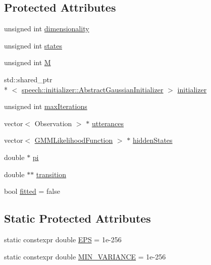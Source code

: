 \subsection*{Protected Attributes}
\begin{DoxyCompactItemize}
\item 
unsigned int \hyperlink{classspeech_1_1HMMLexicon_1_1MultivariateGaussianHMM_aa88d45cf1e299711ed0764166bb70bf1}{dimensionality}
\item 
unsigned int \hyperlink{classspeech_1_1HMMLexicon_1_1MultivariateGaussianHMM_a229cdec64f3eb25b3dc21aa32995ecd8}{states}
\item 
unsigned int \hyperlink{classspeech_1_1HMMLexicon_1_1MultivariateGaussianHMM_a6895e59700c70169286b362532cf3a37}{M}
\item 
std\+::shared\+\_\+ptr\\*
$<$ \hyperlink{classspeech_1_1initializer_1_1AbstractGaussianInitializer}{speech\+::initializer\+::\+Abstract\+Gaussian\+Initializer} $>$ \hyperlink{classspeech_1_1HMMLexicon_1_1MultivariateGaussianHMM_ac83431423d755d272ebb0c4a82c03940}{initializer}
\item 
unsigned int \hyperlink{classspeech_1_1HMMLexicon_1_1MultivariateGaussianHMM_adeadeddbbd4e05647b52357572d9cc94}{max\+Iterations}
\item 
vector$<$ Observation $>$ $\ast$ \hyperlink{classspeech_1_1HMMLexicon_1_1MultivariateGaussianHMM_a8344a96832f52f9691933109e253308e}{utterances}
\item 
vector$<$ \hyperlink{classspeech_1_1HMMLexicon_1_1GMMLikelihoodFunction}{G\+M\+M\+Likelihood\+Function} $>$ $\ast$ \hyperlink{classspeech_1_1HMMLexicon_1_1MultivariateGaussianHMM_ad8e2f5c818a425e7885f0cfb473048c3}{hidden\+States}
\item 
double $\ast$ \hyperlink{classspeech_1_1HMMLexicon_1_1MultivariateGaussianHMM_ab552472450cc99bcf62b9bf03c3956ec}{pi}
\item 
double $\ast$$\ast$ \hyperlink{classspeech_1_1HMMLexicon_1_1MultivariateGaussianHMM_ac5608b1ed95966bfd53854a7bcfe79f7}{transition}
\item 
bool \hyperlink{classspeech_1_1HMMLexicon_1_1MultivariateGaussianHMM_abc3ea4480cc25466e1eb6244231301ec}{fitted} = false
\end{DoxyCompactItemize}
\subsection*{Static Protected Attributes}
\begin{DoxyCompactItemize}
\item 
static constexpr double \hyperlink{classspeech_1_1HMMLexicon_1_1MultivariateGaussianHMM_af30991f897f10c8f6fc70b969656e6cb}{E\+P\+S} = 1e-\/256
\item 
static constexpr double \hyperlink{classspeech_1_1HMMLexicon_1_1MultivariateGaussianHMM_a4dbea35483d7d57afc4dd1ef90e25599}{M\+I\+N\+\_\+\+V\+A\+R\+I\+A\+N\+C\+E} = 1e-\/256
\end{DoxyCompactItemize}


